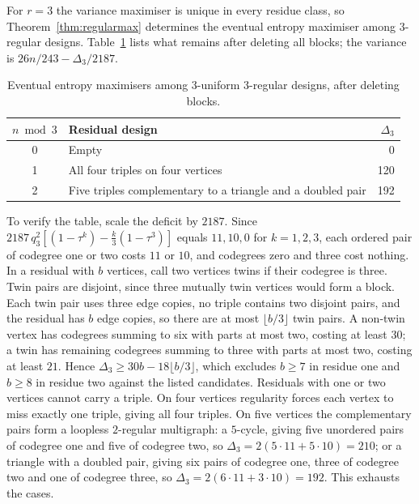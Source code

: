 \documentclass[11pt,a4paper]{article}
\theoremstyle{definition}\newtheorem{remark}[theorem]{Remark}\newtheorem{conjecture}{Conjecture}
\begin{document}
For $r=3$ the variance maximiser is unique in every residue class, so Theorem~\ref{thm:regularmax} determines the eventual entropy maximiser among $3$-regular designs. Table~\ref{tab:rank3} lists what remains after deleting all blocks; the variance is $26n/243-\Delta_3/2187$.
\begin{table}[h]
\centering
\begin{tabular}{c l r}
\toprule
$n\bmod 3$ & Residual design & $\Delta_3$\\
\midrule
0 & Empty & 0\\
1 & All four triples on four vertices & 120\\
2 & Five triples complementary to a triangle and a doubled pair & 192\\
\bottomrule
\end{tabular}
\caption{Eventual entropy maximisers among $3$-uniform $3$-regular designs, after deleting blocks.}\label{tab:rank3}
\end{table}

To verify the table, scale the deficit by $2187$. Since $2187\,q_3^2[(1-\tau^k)-\tfrac k3(1-\tau^3)]$ equals $11,10,0$ for $k=1,2,3$, each ordered pair of codegree one or two costs $11$ or $10$, and codegrees zero and three cost nothing. In a residual with $b$ vertices, call two vertices twins if their codegree is three. Twin pairs are disjoint, since three mutually twin vertices would form a block. Each twin pair uses three edge copies, no triple contains two disjoint pairs, and the residual has $b$ edge copies, so there are at most $\lfloor b/3\rfloor$ twin pairs. A non-twin vertex has codegrees summing to six with parts at most two, costing at least $30$; a twin has remaining codegrees summing to three with parts at most two, costing at least $21$. Hence $\Delta_3\ge30b-18\lfloor b/3\rfloor$, which excludes $b\ge7$ in residue one and $b\ge8$ in residue two against the listed candidates. Residuals with one or two vertices cannot carry a triple. On four vertices regularity forces each vertex to miss exactly one triple, giving all four triples. On five vertices the complementary pairs form a loopless $2$-regular multigraph: a $5$-cycle, giving five unordered pairs of codegree one and five of codegree two, so $\Delta_3=2(5\cdot11+5\cdot10)=210$; or a triangle with a doubled pair, giving six pairs of codegree one, three of codegree two and one of codegree three, so $\Delta_3=2(6\cdot11+3\cdot10)=192$. This exhausts the cases.
\end{document}
